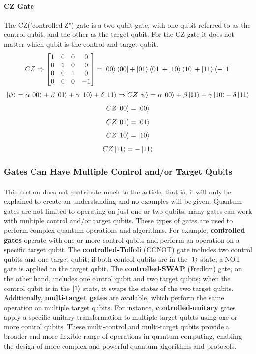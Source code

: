 \documentclass{article}
\begin{document}
\paragraph{CZ Gate}
The CZ("controlled-Z") gate is a two-qubit gate, with one qubit referred to as the control qubit, and the other as the target qubit. For the CZ gate it does not matter which qubit is the control and target qubit.
\begin{equation*}
    CZ \Rightarrow \begin{bmatrix}
                1 & 0 & 0 & 0 \\
                0 & 1 & 0 & 0 \\
                0 & 0 & 1 & 0 \\
                0 & 0 & 0 & -1
            \end{bmatrix} = \ket{00}\bra{00}+\ket{01}\bra{01}+\ket{10}\bra{10}+\ket{11}\bra{-11}
\end{equation*}
\begin{equation*}
        \ket{\psi} = \alpha\ket{00} + \beta\ket{01} + \gamma\ket{10} + \delta\ket{11} \Rightarrow CZ\ket{\psi} = \alpha\ket{00} + \beta\ket{01} + \gamma\ket{10} - \delta\ket{11}
\end{equation*}
$$CZ\ket{00} = \ket{00}$$
$$CZ\ket{01} = \ket{01}$$
$$CZ\ket{10} = \ket{10}$$
$$CZ\ket{11} = -\ket{11}$$
\subsubsection{Gates Can Have Multiple Control and/or Target Qubits}
\paragraph{}This section does not contribute much to the article, that is, it will only be explained to create an understanding and no examples will be given. Quantum gates are not limited to operating on just one or two qubits; many gates can work with multiple control and/or target qubits. These types of gates are used to perform complex quantum operations and algorithms. For example, \textbf{controlled gates} operate with one or more control qubits and perform an operation on a specific target qubit. The \textbf{controlled-Toffoli} (CCNOT) gate includes two control qubits and one target qubit; if both control qubits are in the \( \ket{1} \) state, a NOT gate is applied to the target qubit. The \textbf{controlled-SWAP} (Fredkin) gate, on the other hand, includes one control qubit and two target qubits; when the control qubit is in the \( \ket{1} \) state, it swaps the states of the two target qubits. Additionally, \textbf{multi-target gates} are available, which perform the same operation on multiple target qubits. For instance, \textbf{controlled-unitary} gates apply a specific unitary transformation to multiple target qubits using one or more control qubits. These multi-control and multi-target qubits provide a broader and more flexible range of operations in quantum computing, enabling the design of more complex and powerful quantum algorithms and protocols.
\vspace{3.5cm}
\end{document}
